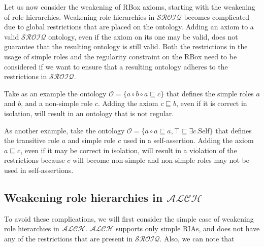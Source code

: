 
Let us now consider the weakening of RBox axioms, starting with the weakening of role hierarchies. Weakening role hierarchies in $\mathcal{SROIQ}$ becomes complicated due to global restrictions that are placed on the ontology. Adding an axiom to a valid $\mathcal{SROIQ}$ ontology, even if the axiom on its one may be valid, does not guarantee that the resulting ontology is still valid. Both the restrictions in the usage of simple roles and the regularity constraint on the RBox need to be considered if we want to ensure that a resulting ontology adheres to the restrictions in $\mathcal{SROIQ}$.

\begin{example}
Take as an example the ontology $\mathcal{O} = \{a \circ b \circ a \sqsubseteq c\}$ that defines the simple roles $a$ and $b$, and a non-simple role $c$. Adding the axiom $c \sqsubseteq b$, even if it is correct in isolation, will result in an ontology that is not regular.
\end{example}

\begin{example}
As another example, take the ontology $\mathcal{O} = \{a \circ a \sqsubseteq a, \top \sqsubseteq \exists c . \mathrm{Self} \}$ that defines the transitive role $a$ and simple role $c$ used in a self-assertion. Adding the axiom $a \sqsubseteq c$, even if it may be correct in isolation, will result in a violation of the restrictions because $c$ will become non-simple and non-simple roles may not be used in self-assertions.
\end{example}

\subsection{Weakening role hierarchies in $\mathcal{ALCH}$} \label{weakening-role-hierarchies-in-mathcal-alch-}

To avoid these complications, we will first consider the simple case of weakening role hierarchies in $\mathcal{ALCH}$. $\mathcal{ALCH}$ supports only simple RIAs, and does not have any of the restrictions that are present in $\mathcal{SROIQ}$. Also, we can note that
